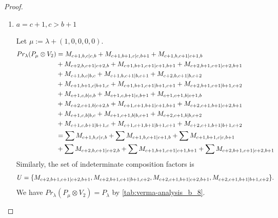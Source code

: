 \begin{proof}
\begin{enumerate}
\begin{enumerate}
      \item $a=c+1,c>b+1$\par
        Let $\mu:=\lambda + (1,0,0,0,0) $.
        \begin{equation}\notag
          \begin{aligned}
            Pr_{\lambda}(P_\mu \otimes V_{2}) &=
M_{c+1,b,c|c,b}
+ M_{c+1,b+1,c|c,b+1}
+ M_{c+1,b,c+1|c+1,b}\\
                                              &
+ M_{c+2,b,c+1|c+2,b}
+ M_{c+1,b+1,c+1|c+1,b+1}
+ M_{c+2,b+1,c+1|c+2,b+1}\\
                                              &
+ M_{c+1,b,c|b,c}
+ M_{c+1,b,c+1|b,c+1}
+ M_{c+2,b,c+1|b,c+2}\\
                                              &
+ M_{c+1,b+1,c|b+1,c}
+ M_{c+1,b+1,c+1|b+1,c+1}
+ M_{c+2,b+1,c+1|b+1,c+2}\\
                                              &
+ M_{c+1,c,b|c,b}
+ M_{c+1,c,b+1|c,b+1}
+ M_{c+1,c+1,b|c+1,b}\\
                                              &
+ M_{c+2,c+1,b|c+2,b}
+ M_{c+1,c+1,b+1|c+1,b+1}
+ M_{c+2,c+1,b+1|c+2,b+1}\\
                                              &
+ M_{c+1,c,b|b,c}
+ M_{c+1,c+1,b|b,c+1}
+ M_{c+2,c+1,b|b,c+2}\\
                                              &
+ M_{c+1,c,b+1|b+1,c}
+ M_{c+1,c+1,b+1|b+1,c+1}
+ M_{c+2,c+1,b+1|b+1,c+2} \\
                                               &=
\sum M_{c+1,b,c|c,b}
+ \sum M_{c+1,b,c+1|c+1,b}
+ \sum M_{c+1,b+1,c|c,b+1}\\
                                              &
+ \sum M_{c+2,b,c+1|c+2,b}
+ \sum M_{c+1,b+1,c+1|c+1,b+1}
+ \sum M_{c+2,b+1,c+1|c+2,b+1}
          \end{aligned}
        \end{equation}
      Similarly, the set of indeterminate composition factors is 
\begin{equation}\notag
  \begin{aligned}
    U = \{
M_{c+2,b+1,c+1|c+2,b+1},
M_{c+2,b+1,c+1|b+1,c+2},
M_{c+2,c+1,b+1|c+2,b+1},
M_{c+2,c+1,b+1|b+1,c+2}
\}.
  \end{aligned}
\end{equation}
       We have $Pr_{\lambda}(P_\mu \otimes V_{2}) = P_\lambda  $ by \cref{tab:verma-analysis_b_8}.
\begin{table}[htbp]
\centering
\caption{Calculation of Verma modules in $\operatorname{Filt}(P_*) \setminus \operatorname{Filt}(\prl(P_\lambda \otimes V_{2})) $ } \label{tab:verma-analysis_b_8}

\end{table}
\end{enumerate}
\end{enumerate}
\end{proof}
